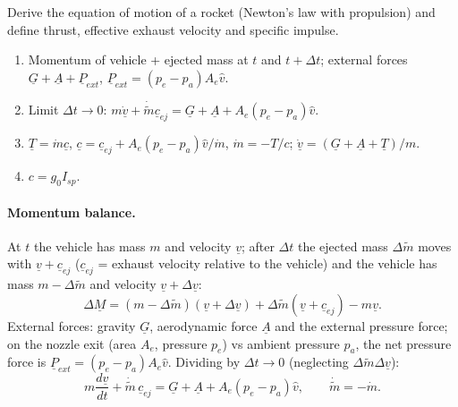 \begin{qbox}
Derive the equation of motion of a rocket (Newton's law with propulsion) and define thrust, effective exhaust velocity and specific impulse.
\end{qbox}
\begin{outline}
\begin{enumerate}
\item Momentum of vehicle + ejected mass at $t$ and $t+\Delta t$; external forces $\underline G+\underline A+\underline P_{ext}$, $\underline P_{ext}=(p_e-p_a)A_e\hat v$.
\item Limit $\Delta t\to0$: $m\dot{\underline v}+\dot{\tilde m}\underline c_{ej}=\underline G+\underline A+A_e(p_e-p_a)\hat v$.
\item $\underline T=\dot m\underline c$, $\underline c=\underline c_{ej}+A_e(p_e-p_a)\hat v/\dot m$, $\dot m=-T/c$; $\dot{\underline v}=(\underline G+\underline A+\underline T)/m$.
\item $c=g_0I_{sp}$.
\end{enumerate}
\end{outline}
\answer
\paragraph{Momentum balance.} At $t$ the vehicle has mass $m$ and velocity $\underline v$; after $\Delta t$ the ejected mass $\Delta\tilde m$ moves with
$\underline v+\underline c_{ej}$ ($\underline c_{ej}$ = exhaust velocity relative to the vehicle) and the vehicle has mass $m-\Delta\tilde m$ and velocity $\underline v+\Delta\underline v$:
\begin{equation}
\Delta\underline M=(m-\Delta\tilde m)(\underline v+\Delta\underline v)+\Delta\tilde m(\underline v+\underline c_{ej})-m\underline v .
\end{equation}
External forces: gravity $\underline G$, aerodynamic force $\underline A$ and the external pressure force; on the nozzle exit (area $A_e$, pressure $p_e$) vs
ambient pressure $p_a$, the net pressure force is $\underline P_{ext}=(p_e-p_a)A_e\hat v$. Dividing by $\Delta t\to0$ (neglecting $\Delta\tilde m\Delta\underline v$):
\begin{equation}
m\frac{d\underline v}{dt}+\dot{\tilde m}\,\underline c_{ej}=\underline G+\underline A+A_e(p_e-p_a)\hat v,\qquad \dot{\tilde m}=-\dot m .
\end{equation}
